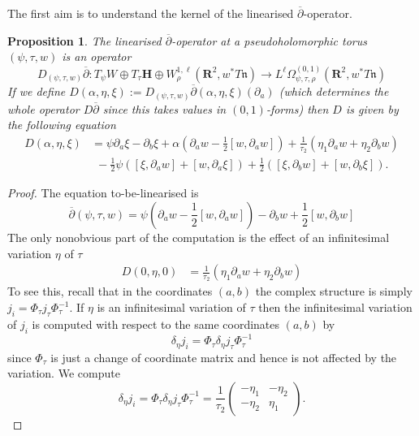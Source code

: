 \documentclass[11pt]{amsart}
\newcommand{\HH}{\mathbf{H}}
\newcommand{\RR}{\mathbf{R}}
\newcommand{\dbar}{\overline{\partial}}
\newcommand{\WW}{W}
\newcommand{\nn}{\mathfrak{n}}
\numberwithin{equation}{section}
\newtheorem{prp}[equation]{Proposition}
\theoremstyle{definition}
\theoremstyle{remark}
\begin{document}
The first aim is to understand the kernel of the linearised $\dbar$-operator.
\begin{prp}
The linearised $\dbar$-operator at a pseudoholomorphic torus $(\psi,\tau,w)$ is an operator
\[D_{(\psi,\tau,w)}\dbar\colon T_{\psi}\WW\oplus T_{\tau}\HH\oplus W^{1,\ell}_{\rho}(\RR^2,w^*T\nn)\to L^{\ell}\Omega^{(0,1)}_{\psi,\tau,\rho}\left(\RR^2,w^*T\nn\right)\]
If we define $D(\alpha,\eta,\xi):=D_{(\psi,\tau,w)}\dbar(\alpha,\eta,\xi)(\partial_a)$ (which determines the whole operator $D\dbar$ since this takes values in $(0,1)$-forms) then $D$ is given by the following equation
\begin{align}\label{lineq}
D(\alpha,\eta,\xi)&=\psi\partial_a\xi-\partial_b\xi+\alpha\left(\partial_aw-\frac{1}{2}[w,\partial_aw]\right)+\frac{1}{\tau_2}\left(\eta_1\partial_aw+\eta_2\partial_bw\right)\\
\nonumber&\ \ -\frac{1}{2}\psi\left([\xi,\partial_aw]+[w,\partial_a\xi]\right)+\frac{1}{2}\left([\xi,\partial_bw]+[w,\partial_b\xi]\right).
\end{align}
\end{prp}
\begin{proof}
The equation to-be-linearised is
\[\dbar(\psi,\tau,w)=\psi\left(\partial_aw-\frac{1}{2}[w,\partial_aw]\right)-\partial_bw+\frac{1}{2}[w,\partial_bw]\]
The only nonobvious part of the computation is the effect of an infinitesimal variation $\eta$ of $\tau$
\begin{align*}D(0,\eta,0)&=\frac{1}{\tau_2}\left(\eta_1\partial_aw+\eta_2\partial_bw\right)
\end{align*}
To see this, recall that in the coordinates $(a,b)$ the complex structure is simply $j_i=\Phi_{\tau}j_{\tau}\Phi_{\tau}^{-1}$. If $\eta$ is an infinitesimal variation of $\tau$ then the infinitesimal variation of $j_i$ is computed with respect to the same coordinates $(a,b)$ by
\[\delta_{\eta} j_i=\Phi_{\tau}\delta_{\eta}j_{\tau}\Phi_{\tau}^{-1}\]
since $\Phi_{\tau}$ is just a change of coordinate matrix and hence is not affected by the variation. We compute
\[\delta_{\eta}j_i=\Phi_{\tau}\delta_{\eta}j_{\tau}\Phi_{\tau}^{-1}=\frac{1}{\tau_2}\left(\begin{array}{cc}
-\eta_1 & -\eta_2\\
-\eta_2 & \eta_1
\end{array}\right).\]
\end{proof}

\end{document}
